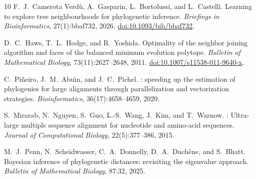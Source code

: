 \begin{thebibliography}{10}
F.~J.~Camerota Verd\`u, A.~Gasparin, L.~Bortolussi, and L.~Castelli.
\newblock Learning to explore tree neighbourhoods for phylogenetic inference.
\newblock \emph{Briefings in Bioinformatics}, 27(1):bbaf732, 2026.
\newblock \href{https://doi.org/10.1093/bib/bbaf732}{doi:10.1093/bib/bbaf732}.

D.~C.~Haws, T.~L.~Hodge, and R.~Yoshida.
\newblock Optimality of the neighbor joining algorithm and faces of the balanced minimum evolution polytope.
\newblock \emph{Bulletin of Mathematical Biology}, 73(11):2627--2648, 2011.
\newblock \href{https://doi.org/10.1007/s11538-011-9640-x}{doi:10.1007/s11538-011-9640-x}.

C.~Pi\~neiro, J.~M.~Abu\'\i n, and J.~C.~Pichel.
: speeding up the estimation of phylogenies for large alignments through parallelization and vectorization strategies.
\newblock \emph{Bioinformatics}, 36(17):4658--4659, 2020.

S.~Mirarab, N.~Nguyen, S.~Guo, L.-S.~Wang, J.~Kim, and T.~Warnow.
: Ultra-large multiple sequence alignment for nucleotide and amino-acid sequences.
\newblock \emph{Journal of Computational Biology}, 22(5):377--386, 2015.

M.~J.~Penn, N.~Scheidwasser, C.~A.~Donnelly, D.~A.~Duch\^ene, and S.~Bhatt.
\newblock Bayesian inference of phylogenetic distances: revisiting the eigenvalue approach.
\newblock \emph{Bulletin of Mathematical Biology}, 87:32, 2025.
\end{thebibliography}
